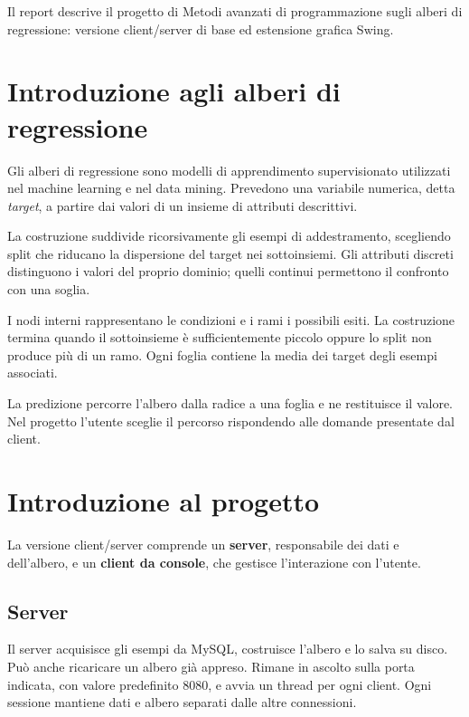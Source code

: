 \documentclass[11pt,a4paper]{article}
\begin{document}

Il report descrive il progetto di Metodi avanzati di programmazione sugli alberi
di regressione: versione client/server di base ed estensione grafica Swing.

\section*{Introduzione agli alberi di regressione}

Gli alberi di regressione sono modelli di apprendimento supervisionato utilizzati
nel machine learning e nel data mining. Prevedono una variabile numerica, detta
\emph{target}, a partire dai valori di un insieme di attributi descrittivi.

La costruzione suddivide ricorsivamente gli esempi di addestramento, scegliendo
split che riducano la dispersione del target nei sottoinsiemi. Gli attributi
discreti distinguono i valori del proprio dominio; quelli continui permettono
il confronto con una soglia.

I nodi interni rappresentano le condizioni e i rami i possibili esiti. La
costruzione termina quando il sottoinsieme è sufficientemente piccolo oppure
lo split non produce più di un ramo. Ogni foglia contiene la media dei target
degli esempi associati.

La predizione percorre l'albero dalla radice a una foglia e ne restituisce il
valore. Nel progetto l'utente sceglie il percorso rispondendo alle domande
presentate dal client.

\section*{Introduzione al progetto}

La versione client/server comprende un \textbf{server}, responsabile dei dati e
dell'albero, e un \textbf{client da console}, che gestisce l'interazione con
l'utente.

\subsection*{Server}

Il server acquisisce gli esempi da MySQL, costruisce l'albero e lo salva su disco.
Può anche ricaricare un albero già appreso. Rimane in ascolto sulla porta indicata,
con valore predefinito 8080, e avvia un thread per ogni client. Ogni sessione
mantiene dati e albero separati dalle altre connessioni.
\end{document}
